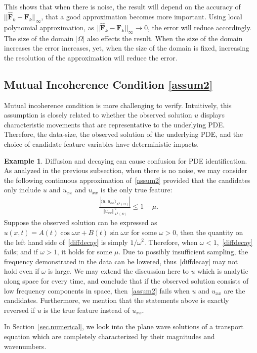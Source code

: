\documentclass[a4paper,11pt]{article}
\newcommand{\bF}{\mathbf{F}}
\theoremstyle{definition}
\newtheorem{example}{Example}[section]
\begin{document}
This shows that when there is noise, the result will depend on the accuracy of $||\widehat{\bF}_k-\bF_k||_\infty$, that a good approximation becomes more important.  Using local polynomial approximation, as  $||\widehat{\bF}_k-\bF_k||_\infty \rightarrow 0$, the error will reduce accordingly.   The size of the domain $|\Omega|$ also effects the result.  When the size of the domain increases the error increases, yet, when the size of the domain is fixed, increasing the resolution of the approximation will reduce the error.

\subsection{Mutual Incoherence Condition \eqref{assum2} }\label{sec.MIP}

Mutual incoherence condition is more challenging to verify. Intuitively, this assumption is closely related to whether the observed solution $u$ displays characteristic  movements that are representative to the underlying PDE. Therefore, the data-size, the observed solution of the underlying PDE, and the choice of candidate feature variables have deterministic impacts.


\begin{example} Diffusion and decaying can cause confusion for PDE identification. As analyzed in the previous subsection, when there is no noise, we may consider the following continuous approximation of~\eqref{assum2} provided that the candidates only include $u$ and $u_{xx}$ and $u_{xx}$ is the only true feature:
\begin{align}
\frac{|\langle u,u_{xx}\rangle_{L^2(\Omega)}|}{||u_{xx}||_{L^2(\Omega)}^2}\leq 1-\mu.\label{diffdecay}
\end{align}
Suppose the observed solution can be expressed as $u(x,t)=A(t)\cos \omega x+B(t)\sin \omega x$ for some $\omega>0$, then the quantity on the left hand side of~\eqref{diffdecay} is simply $1/\omega^2$. Therefore, when $\omega< 1$,~\eqref{diffdecay} fails; and if $\omega> 1$, it holds for some $\mu$. Due to possibly insufficient sampling, the frequency demonstrated in the data can be lowered, thus~\eqref{diffdecay} may not hold even if $\omega$ is large. We may extend the discussion here to $u$ which is analytic along space for every time, and conclude that if the observed solution consists of low frequency components in space, then~\eqref{assum2} fails when $u$ and $u_{xx}$ are the candidates. Furthermore, we mention that the statements above is exactly reversed if $u$ is the true feature instead of $u_{xx}$.
\end{example}
In Section~\ref{sec.numerical}, we look into the plane wave solutions of a transport equation which are completely characterized by their magnitudes and wavenumbers.
\end{document}
